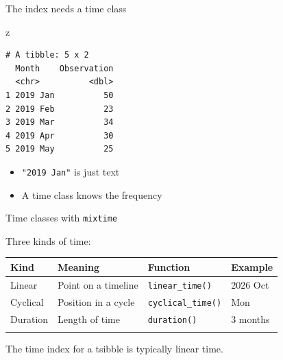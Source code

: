 \documentclass[
  14pt,
  ignorenonframetext,
  aspectratio=169,
]{beamer}
\newenvironment{Shaded}{\begin{snugshade}}{\end{snugshade}}
\newcommand{\NormalTok}[1]{#1}
\newcounter{none} %
\providecommand{\tightlist}{%
  \setlength{\itemsep}{0pt}\setlength{\parskip}{0pt}}
\renewenvironment{Shaded}{\vspace*{0.15cm}\color{black}\fontsize{10}{10}\sf\begin{snugshade}\color{black}}{\end{snugshade}}
\begin{document}
\begin{frame}[fragile]{The index needs a time class}
\protect{}\label{the-index-needs-a-time-class}
\fontsize{12}{13}\sf

\begin{Shaded}
\begin{Highlighting}[]
\NormalTok{z}
\end{Highlighting}
\end{Shaded}

\begin{verbatim}
# A tibble: 5 x 2
  Month    Observation
  <chr>          <dbl>
1 2019 Jan          50
2 2019 Feb          23
3 2019 Mar          34
4 2019 Apr          30
5 2019 May          25
\end{verbatim}

\pause

\begin{itemize}
\tightlist
\item
  \texttt{"2019\ Jan"} is just text
\item
  A time class knows the frequency
\end{itemize}
\end{frame}

\begin{frame}[fragile]{Time classes with \texttt{mixtime}}
\protect{}\label{time-classes-with-mixtime}

\fontsize{12}{13}\sf

Three kinds of time:

{\def\LTcaptype{none} %
\begin{longtable}[]{@{}llll@{}}
\toprule\noalign{}
Kind & Meaning & Function & Example \\
\midrule\noalign{}
\endhead
Linear & Point on a timeline & \texttt{linear\_time()} & 2026 Oct \\
Cyclical & Position in a cycle & \texttt{cyclical\_time()} & Mon \\
Duration & Length of time & \texttt{duration()} & 3 months \\
\bottomrule\noalign{}
\end{longtable}
}

\pause

\vspace*{0.3cm}

The time index for a tsibble is typically \alert{linear time}.
\end{frame}
\end{document}
